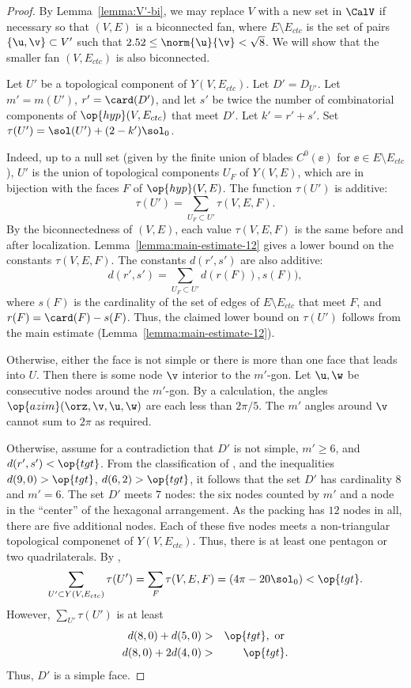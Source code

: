 \begin{proof}
  By Lemma~\ref{lemma:V'-bi}, we may replace $V$ with a new set in
  $\CalV$ if necessary so that $(V,E)$ is a biconnected fan, where
  $E\setminus E_{ctc}$ is the set of pairs $\{\u,\v\}\subset V'$ such
  that $2.52\le\norm{\u}{\v} <\sqrt8$.  We will show that the smaller
  fan $(V,E_{ctc})$ is also biconnected.

  Let $U'$ be a topological component of $Y(V,E_{ctc})$.  Let
  $D'=D_{U'}$.  Let $m'=m(U')$, $r' = \card(D')$, and let $s'$ be
  twice the number of combinatorial components of
  $\op{hyp}(V,E_{ctc})$ that meet $D'$.  Let $k'=r'+s'$.  Set
  $\tau(U') = \sol(U') + (2-k')\sol_0$.

  Indeed,
up to a null set (given by the finite union of blades $C^0(\ee)$ for
$\ee\in E\setminus E_{ctc}$), $U'$ is the union of topological
components $U_F$ of $Y(V,E)$, which are in bijection with the faces
$F$ of $\op{hyp}(V,E)$.  The function $\tau(U')$ is additive:
\[
\tau(U') = \sum_{U_F\subset U'} \tau(V,E,F).
\]
By the biconnectedness of $(V,E)$, each value $\tau(V,E,F)$ is the
same before and after localization.
Lemma~\ref{lemma:main-estimate-12} gives a lower bound on the
constants $\tau(V,E,F)$.  The constants $d(r',s')$ are also additive:
\[
d(r',s') = \sum_{U_F\subset U'} d(r(F)),s(F)),
\]
where $s(F)$ is the cardinality of the set of edges of $E\setminus
E_{ctc}$ that meet $F$, and $r(F) = \card(F)-s(F)$.  Thus, the claimed
lower bound on $\tau(U')$ follows from the main estimate
(Lemma~\ref{lemma:main-estimate-12}).


 Otherwise, either
the face is not simple or there is more than one face that leads into
$U$.  Then there is some node $\v$ interior to the $m'$-gon.  Let
$\u,\w$ be consecutive nodes around the $m'$-gon.  By a
calculation, %
the angles $\op{azim}(\orz,\v,\u,\w)$ are each less than $2\pi/5$. The
$m'$ angles around $\v$ cannot sum to $2\pi$ as required.

  Otherwise, assume for a contradiction
that $D'$ is not simple, $m'\ge 6$, and $d(r',s')<\op{tgt}$.  From the
classification of \cite[p.~126,~Fig.~12.1]{Hales:2006:DCG}, and the
inequalities $d(9,0) > \op{tgt}$, $d(6,2) > \op{tgt}$, it follows that
the set $D'$ has cardinality $8$ and $m'=6$.  The set $D'$ meets $7$
nodes: the six nodes counted by $m'$ and a node in the ``center'' of
the hexagonal arrangement.  As the packing has $12$ nodes in all,
there are five additional nodes.  Each of these five nodes meets a
non-triangular topological componenet of $Y(V,E_{ctc})$.  Thus, there
is at least one pentagon or two quadrilaterals.  By ,
\[
  \sum_{U'\subset Y(V,E_{ctc})} \tau(U') 
=\sum_F \tau(V,E,F) = (4\pi - 20\sol_0) < \op{tgt}.
\]
However, $\sum_{U'} \tau(U')$ is at least
\begin{eqnarray*}
d(8,0) + d(5,0) &>& \op{tgt}, \text{ or }\\
d(8,0) + 2 d(4,0) &>& \op{tgt}.
\end{eqnarray*}
Thus, $D'$ is a simple face.
%
%


\end{proof}
